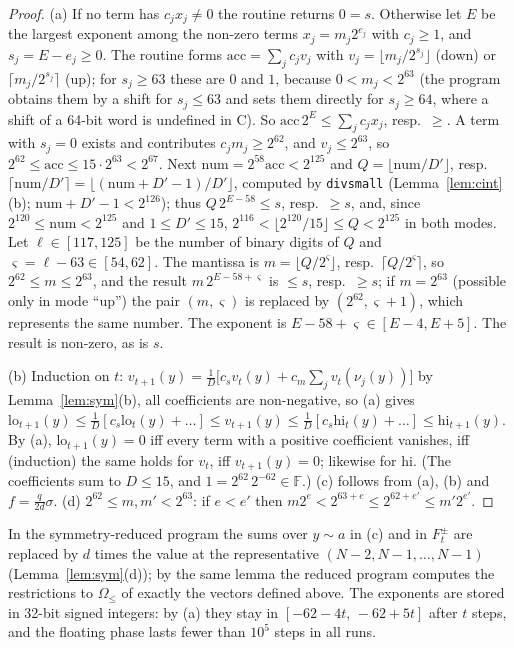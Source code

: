 \begin{proof}
(a) If no term has $c_jx_j\ne0$ the routine returns $0=s$. Otherwise let $E$ be the largest exponent among the non-zero terms $x_j=m_j2^{e_j}$ with $c_j\ge1$, and $s_j=E-e_j\ge0$. The routine forms $\mathrm{acc}=\sum_jc_jv_j$ with $v_j=\lfloor m_j/2^{s_j}\rfloor$ (down) or $\lceil m_j/2^{s_j}\rceil$ (up); for $s_j\ge63$ these are $0$ and $1$, because $0<m_j<2^{63}$ (the program obtains them by a shift for $s_j\le63$ and sets them directly for $s_j\ge64$, where a shift of a 64-bit word is undefined in C). So $\mathrm{acc}\,2^E\le\sum_jc_jx_j$, resp.\ $\ge$. A term with $s_j=0$ exists and contributes $c_jm_j\ge2^{62}$, and $v_j\le2^{63}$, so $2^{62}\le\mathrm{acc}\le15\cdot2^{63}<2^{67}$. Next $\mathrm{num}=2^{58}\mathrm{acc}<2^{125}$ and $Q=\lfloor\mathrm{num}/D'\rfloor$, resp.\ $\lceil\mathrm{num}/D'\rceil=\lfloor(\mathrm{num}+D'-1)/D'\rfloor$, computed by \texttt{divsmall} (Lemma~\ref{lem:cint}(b); $\mathrm{num}+D'-1<2^{126}$); thus $Q\,2^{E-58}\le s$, resp.\ $\ge s$, and, since $2^{120}\le\mathrm{num}<2^{125}$ and $1\le D'\le15$, $2^{116}<\lfloor2^{120}/15\rfloor\le Q<2^{125}$ in both modes. Let $\ell\in[117,125]$ be the number of binary digits of $Q$ and $\varsigma=\ell-63\in[54,62]$. The mantissa is $m=\lfloor Q/2^\varsigma\rfloor$, resp.\ $\lceil Q/2^\varsigma\rceil$, so $2^{62}\le m\le2^{63}$, and the result $m\,2^{E-58+\varsigma}$ is $\le s$, resp.\ $\ge s$; if $m=2^{63}$ (possible only in mode ``up'') the pair $(m,\varsigma)$ is replaced by $(2^{62},\varsigma+1)$, which represents the same number. The exponent is $E-58+\varsigma\in[E-4,E+5]$. The result is non-zero, as is $s$.

(b) Induction on $t$: $v_{t+1}(y)=\frac1D\bigl[c_sv_t(y)+c_m\sum_jv_t(\nu_j(y))\bigr]$ by Lemma~\ref{lem:sym}(b), all coefficients are non-negative, so (a) gives $\mathrm{lo}_{t+1}(y)\le\frac1D[c_s\mathrm{lo}_t(y)+\dots]\le v_{t+1}(y)\le\frac1D[c_s\mathrm{hi}_t(y)+\dots]\le\mathrm{hi}_{t+1}(y)$. By (a), $\mathrm{lo}_{t+1}(y)=0$ iff every term with a positive coefficient vanishes, iff (induction) the same holds for $v_t$, iff $v_{t+1}(y)=0$; likewise for $\mathrm{hi}$. (The coefficients sum to $D\le15$, and $1=2^{62}\,2^{-62}\in\mathbb F$.)
(c) follows from (a), (b) and $f=\frac q{2d}\sigma$. (d) $2^{62}\le m,m'<2^{63}$: if $e<e'$ then $m2^e<2^{63+e}\le2^{62+e'}\le m'2^{e'}$.
\end{proof}

In the symmetry-reduced program the sums over $y\sim a$ in (c) and in $F^\pm_t$ are replaced by $d$ times the value at the representative $(N-2,N-1,\dots,N-1)$ (Lemma~\ref{lem:sym}(d)); by the same lemma the reduced program computes the restrictions to $\Omega_\le$ of exactly the vectors defined above. The exponents are stored in 32-bit signed integers: by (a) they stay in $[-62-4t,\,-62+5t]$ after $t$ steps, and the floating phase lasts fewer than $10^5$ steps in all runs.

